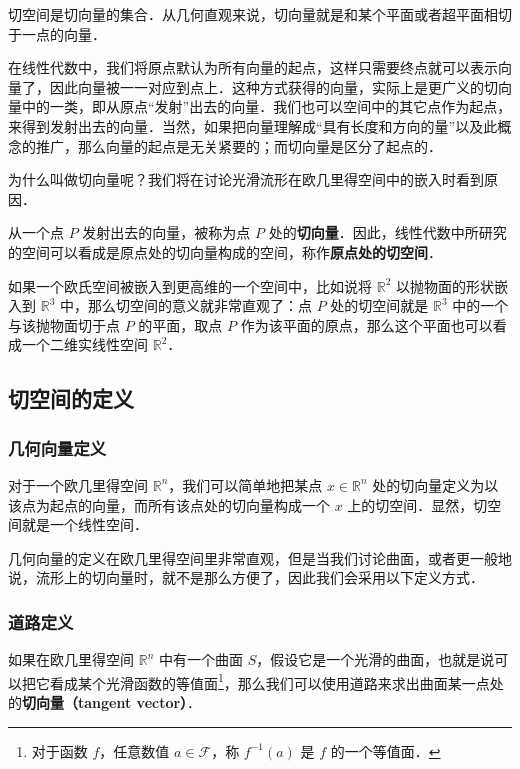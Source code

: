 

切空间是切向量的集合．从几何直观来说，切向量就是和某个平面或者超平面相切于一点的向量．

在线性代数中，我们将原点默认为所有向量的起点，这样只需要终点就可以表示向量了，因此向量被一一对应到点上．这种方式获得的向量，实际上是更广义的切向量中的一类，即从原点“发射”出去的向量．我们也可以空间中的其它点作为起点，来得到发射出去的向量．当然，如果把向量理解成“具有长度和方向的量”以及此概念的推广，那么向量的起点是无关紧要的；而切向量是区分了起点的．

为什么叫做切向量呢？我们将在讨论光滑流形在欧几里得空间中的嵌入时看到原因．%

从一个点 $P$ 发射出去的向量，被称为点 $P$ 处的\textbf{切向量}．因此，线性代数中所研究的空间可以看成是原点处的切向量构成的空间，称作\textbf{原点处的切空间}．

如果一个欧氏空间被嵌入到更高维的一个空间中，比如说将 $\mathbb{R}^2$ 以抛物面的形状嵌入到 $\mathbb{R}^3$ 中，那么切空间的意义就非常直观了：点 $P$ 处的切空间就是 $\mathbb{R}^3$ 中的一个与该抛物面切于点 $P$ 的平面，取点 $P$ 作为该平面的原点，那么这个平面也可以看成一个二维实线性空间 $\mathbb{R}^2$．

\subsection{切空间的定义}

\subsubsection{几何向量定义}

对于一个欧几里得空间 $\mathbb{R}^n$，我们可以简单地把某点 $x\in\mathbb{R}^n$ 处的切向量定义为以该点为起点的向量，而所有该点处的切向量构成一个 $x$ 上的切空间．显然，切空间就是一个线性空间．

几何向量的定义在欧几里得空间里非常直观，但是当我们讨论曲面，或者更一般地说，流形上的切向量时，就不是那么方便了，因此我们会采用以下定义方式．

\subsubsection{道路定义}

如果在欧几里得空间 $\mathbb{R}^n$ 中有一个曲面 $S$，假设它是一个光滑的曲面，也就是说可以把它看成某个光滑函数的等值面\footnote{对于函数 $f$，任意数值 $a\in\mathcal{F}$，称 $f^{-1}(a)$ 是 $f$ 的一个等值面．}，那么我们可以使用道路来求出曲面某一点处的\textbf{切向量（tangent vector）}．

